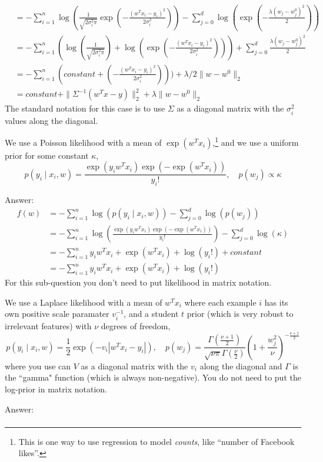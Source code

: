 \documentclass{article}
\def\ans#1{\par\gre{Answer: #1}}
\def\gre#1{{\color{gre}#1}}
\def\cond{\; | \;}
\begin{document}
{{\begin{align*}
        & = -\sum_{i=1}^n \log(\frac{1}{\sqrt{2\sigma_i^2\pi}}\exp\left(-\frac{(w^Tx_i - y_i)^2}{2\sigma_i^2}\right)) - \sum _{j=0} ^d \log(\exp\left(-\frac{\lambda(w_j -  w^0_j)^2}{2}\right))\\
        & = -\sum_{i=1}^n (\log(\frac{1}{\sqrt{2\sigma_i^2\pi}}) + \log(\exp\left(-\frac{(w^Tx_i - y_i)^2}{2\sigma_i^2}\right))) + \sum _{j=0} ^d \frac{\lambda(w_j -  w^0_j)^2}{2}\\
        & = -\sum_{i=1}^n (constant + \left(-\frac{(w^Tx_i - y_i)^2}{2\sigma_i^2}\right))) + \lambda/2 \|w - w^0\|_2\\
        & = constant + \|{\Sigma^{-1}(w^Tx - y)}\|_2^2 + \lambda \|w - w^0\|_2
    \end{align*}
}
The standard notation for this case is to use $\Sigma$ as a diagonal matrix with the $\sigma_i^2$ values along the diagonal.
\item We use a Poisson likelihood with a mean of $\exp(w^Tx_i)$,\footnote{This is one way to use regression to model \emph{counts}, like ``number of Facebook likes''.} and we use a uniform prior for some constant $\kappa$,
\[
p(y_i \cond x_i, w) = \frac{\exp(y_iw^Tx_i)\exp(-\exp(w^Tx_i))}{y_i!}, \quad p(w_j) \propto \kappa
\]
\ans{
\begin{align*}
    f(w) &= -\sum_{i=1}^n \log(p(y_i \cond x_i, w)) - \sum _{j=0} ^d \log(p(w_j))\\
    & = -\sum_{i=1}^n \log(\frac{\exp(y_iw^Tx_i)\exp(-\exp(w^Tx_i))}{y_i!}) - \sum _{j=0} ^d \log(\kappa)\\
    & = -\sum_{i=1}^n y_iw^Tx_i + \exp(w^Tx_i) + \log(y_i!) + constant \\
    & = -\sum_{i=1}^n y_iw^Tx_i + \exp(w^Tx_i) + \log(y_i!)
\end{align*}
}
For this sub-question you don't need to put likelihood in matrix notation.
\item We use a Laplace likelihood with a mean of $w^Tx_i$ where each example $i$ has its own positive scale paramater $v_i^{-1}$, and a  student $t$ prior (which is very robust to irrelevant features) with $\nu$ degrees of freedom,
\[
p(y_i \cond x_i, w) = \frac 1 2 \exp\left(-v_i|w^Tx_i - y_i|\right), \quad  p(w_j) = \frac{\Gamma\left(\frac{\nu + 1}{2}\right)}{\sqrt{\nu\pi}\Gamma\left(\frac \nu 2\right)}\left(1 + \frac{w_j^2}{\nu}\right)^{-\frac{\nu+1}{2}}
\]
where you use can $V$ as a diagonal matrix with the $v_i$ along the diagonal and $\Gamma$ is the ``gamma" function (which is always non-negative). You do not need to put the log-prior in matrix notation.
\ans{
    \begin{align*}

\end{align*}}}
\end{document}

